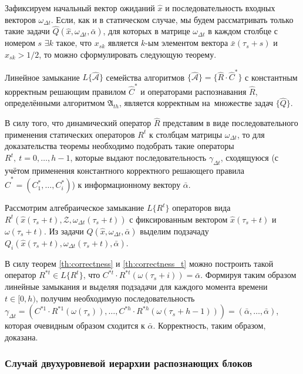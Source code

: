 Зафиксируем начальный вектор ожиданий $\hat{x}$ и последовательность входных векторов $\omega_{\Delta{t}}$. Если, как и в статическом случае, мы будем рассматривать только такие задачи $\hat{Q}(\hat{x},\omega_{\Delta{t}},\bar{\alpha})$, для которых в матрице $\omega_{\Delta{t}}$ в каждом столбце с номером $s$ ${\exists}k$ такое, что $x_{sk}$ является $k$-ым элементом вектора $\bar{x}(\tau_s+s)$ и $x_{sk}>1/2$, то можно сформулировать следующую теорему.

\begin{Theorem}\label{th:correctness_d}
	Линейное замыкание $L\{\hat{\mathcal{A}}\}$ семейства алгоритмов $\{\hat{\mathcal{A}}\}=\{\hat{R}{\cdot}\hat{C}^*\}$ с константным корректным решающим правилом $\hat{C}^*$ и операторами распознавания $\hat{R}$, определёнными алгоритмом $\mathfrak{A}_{th}$, является корректным на~множестве задач $\{\hat{Q}\}$.
\end{Theorem}

\begin{Proof}
	В силу того, что динамический оператор $\hat{R}$ представим в виде последовательного применения статических операторов $R^t$ к столбцам матрицы $\omega_{\Delta{t}}$, то для доказательства теоремы необходимо подобрать такие операторы $R^t,\ t=0,\dots,h-1$, которые выдают последовательность $\gamma_{\Delta{t}}$, сходящуюся (с учётом применения константного корректного решающего правила $\hat{C}^*=(C_1^*,\dots,C_i^*)$) к информационному вектору $\bar{\alpha}$.
	
	Рассмотрим алгебраическое замыкание $L\{R^t\}$ операторов вида $R^t(\hat{x}(\tau_s+t), \mathcal Z, \omega_{\Delta t}(\tau_s+t))$ с фиксированным вектором $\hat{x}(\tau_s+t)$ и $\omega(\tau_s+t)$. Из задачи $\hat{Q}(\hat{x}, \omega_{{\Delta}t}, \bar{\alpha})$ выделим подзачаду $Q_i(\hat x(\tau_s+t), \omega_{\Delta t}(\tau_s+t),\bar\alpha)$. 

	В силу теорем \ref{th:correctness} и \ref{th:correctness_t} можно построить такой оператор $R^{*t}\in{L}\{R^t\}$, что $C^{*t}\cdot R^{*t}(\omega(\tau_s+i))=\bar{\alpha}$. Формируя таким образом линейные замыкания и выделяя подзадачи для каждого момента времени $t\in[0,h)$, получим необходимую последовательность $\gamma_{\Delta t}=(C^{*1}\cdot R^{*1}(\omega(\tau_s)), \dots, C^{*h}\cdot R^{*h}(\omega(\tau_s+h-1)))=(\bar{\alpha},\dots,\bar{\alpha})$, которая очевидным образом сходится к $\bar{\alpha}$. Корректность, таким образом, доказана.		
\end{Proof}
	
\subsubsection{Случай двухуровневой иерархии распознающих блоков}

